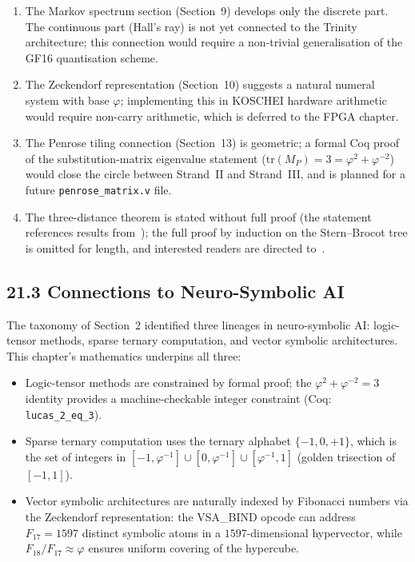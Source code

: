 \begin{enumerate}
  \item
    The Markov spectrum section (Section~9) develops
    only the discrete part.
    The continuous part (Hall's ray) is not yet
    connected to the Trinity architecture; this
    connection would require a non-trivial
    generalisation of the GF16 quantisation scheme.
  \item
    The Zeckendorf representation (Section~10)
    suggests a natural numeral system with base
    $\varphi$; implementing this in KOSCHEI hardware
    arithmetic would require non-carry arithmetic,
    which is deferred to the FPGA chapter.
  \item
    The Penrose tiling connection (Section~13)
    is geometric; a formal Coq proof of the
    substitution-matrix eigenvalue statement
    ($\mathrm{tr}(M_P) = 3 = \varphi^2 + \varphi^{-2}$)
    would close the circle between Strand~II and
    Strand~III, and is planned for a future
    \texttt{penrose\_matrix.v} file.
  \item
    The three-distance theorem is stated without
    full proof (the statement references results
    from~\cite{alessandri1998}); the full proof by
    induction on the Stern--Brocot tree is omitted
    for length, and interested readers are
    directed to~\cite{khinchin_continued_fractions}.
\end{enumerate}

\subsection{21.3 Connections to Neuro-Symbolic AI}
\label{subsec:gc-ns-connection}

The taxonomy of Section~2 identified three lineages
in neuro-symbolic AI: logic-tensor methods, sparse
ternary computation, and vector symbolic architectures.
This chapter's mathematics underpins all three:
\begin{itemize}
  \item Logic-tensor methods are constrained by formal
    proof; the $\varphi^2 + \varphi^{-2} = 3$ identity
    provides a machine-checkable integer constraint
    (Coq: \texttt{lucas\_2\_eq\_3}).
  \item Sparse ternary computation uses the ternary
    alphabet $\{-1,0,+1\}$, which is the set of
    integers in $[-1, \varphi^{-1}] \cup [0, \varphi^{-1}]
    \cup [\varphi^{-1}, 1]$ (golden trisection of
    $[-1,1]$).
  \item Vector symbolic architectures are naturally
    indexed by Fibonacci numbers via the Zeckendorf
    representation: the VSA\_BIND opcode can address
    $F_{17}=1597$ distinct symbolic atoms in a $1597$-dimensional
    hypervector, while $F_{18}/F_{17} \approx \varphi$
    ensures uniform covering of the hypercube.
\end{itemize}

